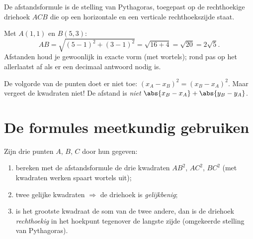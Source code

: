 \begin{omfigure}

{\small De afstandsformule is de stelling van Pythagoras, toegepast op de
rechthoekige driehoek $ACB$ die op een horizontale en een verticale
rechthoekszijde staat.}
\end{omfigure}

\begin{example}\label{ex:g10:coordgeom:distance}
Met $A(1, 1)$ en $B(5, 3)$:
\[
AB = \sqrt{(5-1)^2 + (3-1)^2} = \sqrt{16 + 4} = \sqrt{20} = 2\sqrt 5 .
\]
Afstanden houd je gewoonlijk in exacte vorm (met wortels); rond pas op het
allerlaatst af als er een decimaal antwoord nodig is.
\end{example}

\begin{remark}
De volgorde van de punten doet er niet toe: $(x_A - x_B)^2 =
(x_B - x_A)^2$. Maar vergeet de kwadraten niet! De afstand is \emph{niet}
$\abs{x_B - x_A} + \abs{y_B - y_A}$.
\end{remark}

\section{De formules meetkundig gebruiken}

\begin{method}\label{met:g10:coordgeom:triangle}
Zijn drie punten $A$, $B$, $C$ door hun  gegeven:
\begin{enumerate}
  \item bereken met de afstandsformule de drie kwadraten $AB^2$, $AC^2$,
        $BC^2$ (met kwadraten werken spaart wortels uit);
  \item twee gelijke kwadraten $\Rightarrow$ de driehoek is
        \emph{gelijkbenig};
  \item is het grootste kwadraat de som van de twee andere, dan is de driehoek
        \emph{rechthoekig} in het hoekpunt tegenover de langste zijde
        (omgekeerde stelling van Pythagoras).
\end{enumerate}
\end{method}

